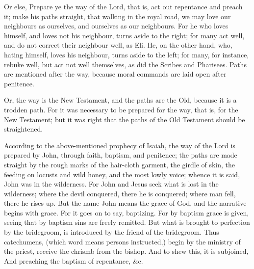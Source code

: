  Or else, Prepare ye the way of the Lord, that is, act out repentance and preach it; make his paths straight, that walking in the royal road, we may love our neighbours as ourselves, and ourselves as our neighbours. For he who loves himself, and loves not his neighbour, turns aside to the right; for many act well, and do not correct their neighbour well, as Eli. He, on the other hand, who, hating himself, loves his neighbour, turns aside to the left; for many, for instance, rebuke well, but act not well themselves, as did the Scribes and Pharisees. Paths are mentioned after the way, because moral commands are laid open after penitence.

 Or, the way is the New Testament, and the paths are the Old, because it is a trodden path. For it was necessary to be prepared for the way, that is, for the New Testament; but it was right that the paths of the Old Testament should be straightened.

 

 According to the above-mentioned prophecy of Isaiah, the way of the Lord is prepared by John, through faith, baptism, and penitence; the paths are made straight by the rough marks of the hair-cloth garment, the girdle of skin, the feeding on locusts and wild honey, and the most lowly voice; whence it is said, John was in the wilderness. For John and Jesus seek what is lost in the wilderness; where the devil conquered, there he is conquered; where man fell, there he rises up. But the name John means the grace of God, and the narrative begins with grace. For it goes on to say, baptizing. For by baptism grace is given, seeing that by baptism sins are freely remitted. But what is brought to perfection by the bridegroom, is introduced by the friend of the bridegroom. Thus catechumens, (which word means persons instructed,) begin by the ministry of the priest, receive the chrismb from the bishop. And to shew this, it is subjoined, And preaching the baptism of repentance, \&c.

